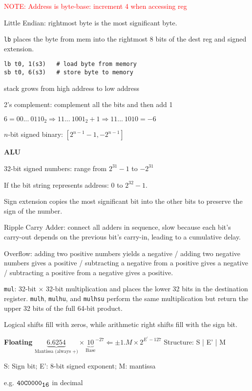 \documentclass[10pt,landscape,a4paper]{article}
\begin{document}
\begin{multicols}{3}
\textcolor{red}{NOTE: Address is byte-base: increment 4 when accessing reg}

Little Endian: rightmost byte is the most significant byte.

\verb|lb| places the byte from mem into the rightmost 8 bits of the dest reg and signed extension.
\begin{verbatim}
lb t0, 1(s3)   # load byte from memory
sb t0, 6(s3)   # store byte to memory
\end{verbatim}

stack grows from high address to low address

2's complement: complement all the bits and then add 1

\(6 = 00...\ 0110_2 \Rightarrow 11...\ 1001_2 + 1 \Rightarrow 11 ...\ 1010 = -6\)

\(n\)-bit signed binary: \([2^{n-1} - 1, -2^{n-1}]\)

\textbf{ALU}

32-bit signed numbers: range from \(2^{31} - 1\) to \(-2^{31}\)

If the bit string represents address: 0 to \(2^{32} - 1\).

Sign extension copies the most significant bit into the other bits to preserve the sign of the number.

Ripple Carry Adder: connect all adders in sequence, slow because each bit's carry-out depends on the previous bit's carry-in, leading to a cumulative delay.

Overflow: adding two positive numbers yields a negative / adding two negative numbers gives a positive / subtracting a negative from a positive gives a negative / subtracting a positive from a negative gives a positive.

\verb|mul|: 32-bit \(\times\) 32-bit multiplication and places the lower 32 bits in the destination register. \verb|mulh|, \verb|mulhu|, and \verb|mulhsu| perform the same multiplication but return the upper 32 bits of the full 64-bit product.

Logical shifts fill with zeros, while arithmetic right shifts fill with the sign bit.

\textbf{Floating}
\(
  \underbrace{6.6254}_{\text{Mantissa (always +)}} \times {\underbrace{10}_{\text{Base}}}^{-27} \Longleftarrow \pm 1.M \times 2^{E^{\prime} - 127}
\)
Structure: S | E' | M

S: Sign bit; E': 8-bit signed exponent; M: mantissa 

e.g. \(\verb|40C0000|_{\verb|16|}\) in decimal


\end{multicols}
\end{document}
